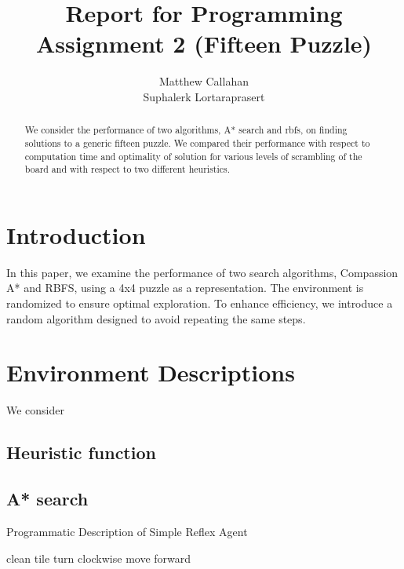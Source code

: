 \documentclass{article}
\title{Report for Programming Assignment 2 (Fifteen Puzzle)}
\author{%
  Matthew Callahan\\
  \And
  Suphalerk Lortaraprasert
}
\begin{document}
\maketitle


\begin{abstract}
 We consider the performance of two algorithms, A* search and rbfs, on finding solutions to a generic fifteen puzzle. We compared their performance with respect to computation time and optimality of solution for various levels of scrambling of the board and with respect to two different heuristics. 
\end{abstract}

\section{Introduction}

In this paper, we examine the performance of two search algorithms, Compassion A* and RBFS, using a 4x4 puzzle as a representation. The environment is randomized to ensure optimal exploration. To enhance efficiency, we introduce a random algorithm designed to avoid repeating the same steps.

\section{Environment Descriptions}
We consider 

\subsection{Heuristic function}

\subsection{A* search}

\begin{algorithm}[h]
  
  \caption{Programmatic Description of Simple Reflex Agent}
  \begin{algorithmic}[1]
    
    \State clean tile 
    \EndIf
    \State turn clockwise
    \EndIf
    \State move forward
    \EndIf
    \EndFor
  \end{algorithmic}
  \label{alg:A*}
\end{algorithm}
\end{document}
